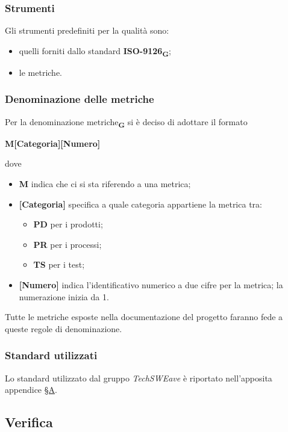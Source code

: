 \subsubsection{Strumenti}
Gli strumenti predefiniti per la qualità sono:
\begin{itemize}
    \item quelli forniti dallo standard \textbf{ISO-9126}\textsubscript{\textbf{G}};
    \item le metriche.
\end{itemize}
\subsubsection{Denominazione delle metriche}
Per la denominazione metriche\textsubscript{\textbf{G}} si è deciso di adottare il formato
\begin{center}
    \textbf{M[Categoria][Numero]}
\end{center}
dove
\begin{itemize}
    \item \textbf{M} indica che ci si sta riferendo a una metrica;
    \item \textbf{[Categoria]} specifica a quale categoria appartiene la metrica tra:\begin{itemize}
              \item \textbf{PD} per i prodotti;
              \item \textbf{PR} per i processi;
              \item \textbf{TS} per i test;
          \end{itemize}
    \item \textbf{[Numero]} indica l'identificativo numerico a due cifre per la metrica; la numerazione inizia da 1.
\end{itemize}
Tutte le metriche esposte nella documentazione del progetto faranno fede a queste regole di denominazione.



\subsubsection{Standard utilizzati}
Lo standard utilizzato dal gruppo \textit{TechSWEave} è riportato nell'apposita appendice \hyperref[sec:A]{§A}.

\subsection{Verifica}
